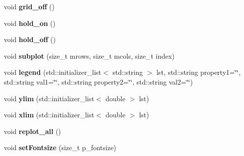 \begin{DoxyCompactItemize}
\item 
\hypertarget{classkeycpp_1_1_figure_a3736e01bc278c2c2b47e4ff046fdda0e}{void {\bfseries grid\-\_\-off} ()}\label{classkeycpp_1_1_figure_a3736e01bc278c2c2b47e4ff046fdda0e}

\item 
\hypertarget{classkeycpp_1_1_figure_a65b80e5b67c7bbf225e3001a538a6dad}{void {\bfseries hold\-\_\-on} ()}\label{classkeycpp_1_1_figure_a65b80e5b67c7bbf225e3001a538a6dad}

\item 
\hypertarget{classkeycpp_1_1_figure_ae5e5ac67e9450ea4fbf06fb3fcc6523a}{void {\bfseries hold\-\_\-off} ()}\label{classkeycpp_1_1_figure_ae5e5ac67e9450ea4fbf06fb3fcc6523a}

\item 
\hypertarget{classkeycpp_1_1_figure_a6d7d8120a0301c002bf40b46fd8b560d}{void {\bfseries subplot} (size\-\_\-t mrows, size\-\_\-t mcols, size\-\_\-t index)}\label{classkeycpp_1_1_figure_a6d7d8120a0301c002bf40b46fd8b560d}

\item 
\hypertarget{classkeycpp_1_1_figure_a2b5a0aae355a33024d2f6c51a8754786}{void {\bfseries legend} (std\-::initializer\-\_\-list$<$ std\-::string $>$ lst, std\-::string property1=\char`\"{}\char`\"{}, std\-::string val1=\char`\"{}\char`\"{}, std\-::string property2=\char`\"{}\char`\"{}, std\-::string val2=\char`\"{}\char`\"{})}\label{classkeycpp_1_1_figure_a2b5a0aae355a33024d2f6c51a8754786}

\item 
\hypertarget{classkeycpp_1_1_figure_aa01c44e6509c7075f4f547531c39741b}{void {\bfseries ylim} (std\-::initializer\-\_\-list$<$ double $>$ lst)}\label{classkeycpp_1_1_figure_aa01c44e6509c7075f4f547531c39741b}

\item 
\hypertarget{classkeycpp_1_1_figure_ae779c53eebbee42148324bd8adfd7d01}{void {\bfseries xlim} (std\-::initializer\-\_\-list$<$ double $>$ lst)}\label{classkeycpp_1_1_figure_ae779c53eebbee42148324bd8adfd7d01}

\item 
\hypertarget{classkeycpp_1_1_figure_a47cae082612e5436a6b0bc3d7f27e9d9}{void {\bfseries replot\-\_\-all} ()}\label{classkeycpp_1_1_figure_a47cae082612e5436a6b0bc3d7f27e9d9}

\item 
\hypertarget{classkeycpp_1_1_figure_a38aea1e2c4cd849622e57ed346ec52f5}{void {\bfseries set\-Fontsize} (size\-\_\-t p\-\_\-fontsize)}\label{classkeycpp_1_1_figure_a38aea1e2c4cd849622e57ed346ec52f5}


\end{DoxyCompactItemize}
